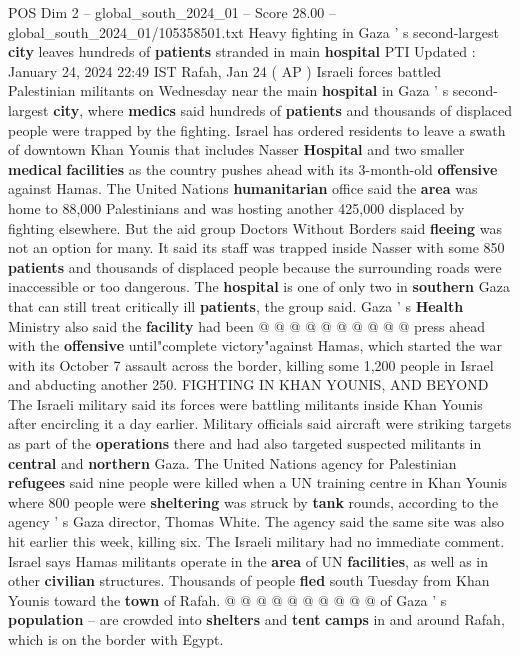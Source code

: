 \begin{textsample}{POS Dim 2 – global\_south\_2024\_01 – Score 28.00 – global\_south\_2024\_01/105358501.txt}  \label{ex:f2_pos_128}
Heavy fighting in Gaza ' s second-largest \textbf{city} leaves hundreds of \textbf{patients} stranded in main \textbf{hospital} PTI Updated : January 24, 2024 22:49 IST Rafah, Jan 24 ( AP ) Israeli forces battled Palestinian militants on Wednesday near the main \textbf{hospital} in Gaza ' s second-largest \textbf{city}, where \textbf{medics} said hundreds of \textbf{patients} and thousands of displaced people were trapped by the fighting.
Israel has ordered residents to leave a swath of downtown Khan Younis that includes Nasser \textbf{Hospital} and two smaller \textbf{medical} \textbf{facilities} as the country pushes ahead with its 3-month-old \textbf{offensive} against Hamas.
The United Nations \textbf{humanitarian} office said the \textbf{area} was home to 88,000 Palestinians and was hosting another 425,000 displaced by fighting elsewhere.
But the aid group Doctors Without Borders said \textbf{fleeing} was not an option for many.
It said its staff was trapped inside Nasser with some 850 \textbf{patients} and thousands of displaced people because the surrounding roads were inaccessible or too dangerous.
The \textbf{hospital} is one of only two in \textbf{southern} Gaza that can still treat critically ill \textbf{patients}, the group said.
Gaza ' s \textbf{Health} Ministry also said the \textbf{facility} had been @ @ @ @ @ @ @ @ @ @ press ahead with the \textbf{offensive} until"complete victory"against Hamas, which started the war with its October 7 assault across the border, killing some 1,200 people in Israel and abducting another 250.
FIGHTING IN KHAN YOUNIS, AND BEYOND The Israeli military said its forces were battling militants inside Khan Younis after encircling it a day earlier.
Military officials said aircraft were striking targets as part of the \textbf{operations} there and had also targeted suspected militants in \textbf{central} and \textbf{northern} Gaza.
The United Nations agency for Palestinian \textbf{refugees} said nine people were killed when a UN training centre in Khan Younis where 800 people were \textbf{sheltering} was struck by \textbf{tank} rounds, according to the agency ' s Gaza director, Thomas White.
The agency said the same site was also hit earlier this week, killing six.
The Israeli military had no immediate comment.
Israel says Hamas militants operate in the \textbf{area} of UN \textbf{facilities}, as well as in other \textbf{civilian} structures.
Thousands of people \textbf{fled} south Tuesday from Khan Younis toward the \textbf{town} of Rafah. @ @ @ @ @ @ @ @ @ @ of Gaza ' s \textbf{population} -- are crowded into \textbf{shelters} and \textbf{tent} \textbf{camps} in and around Rafah, which is on the border with Egypt.

\end{textsample}

